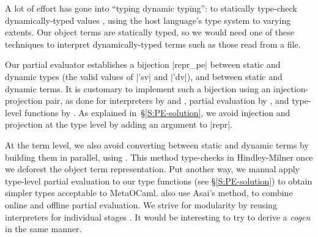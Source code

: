 \ifshort\else
A lot of effort has gone into ``typing dynamic typing'': to statically
type-check dynamically\hyp typed values
\citep{baars-typing,WalidICFP02,Guillemette-Monier-PLPV,haskell-list},
using the host language's type system to varying extents.
Our object terms are statically typed, so we would
need one of these techniques to interpret dynamically\hyp typed
terms such as those read from a file.
\fi

Our partial evaluator establishes a bijection |repr_pe| between static
and dynamic types (the valid values of |'sv| and |'dv|), and between
static and dynamic terms.  It is customary to implement such a bijection
using an injection\hyp projection pair, as done for interpreters
\ifshort \cite{Ramsey-ML-module-mania,Benton-embedded-interpreters}\else
by \citet{Ramsey-ML-module-mania} and \citet{Benton-embedded-interpreters}\fi,
partial evaluation \ifshort \cite{Danvy-TDPE}\else by \citet{Danvy-TDPE}\fi,
and type-level functions \ifshort \cite{oliveira-typecase}\else by
\citet{oliveira-typecase}\fi.  As explained in~\S\ref{S:PE-solution}, we
avoid injection and projection at the type level by adding an argument
to |repr|.

At the term level, we also avoid converting between static and dynamic
terms by building them in parallel, using \citet{asai-binding-time}.
This method type-checks in Hindley-Milner once we
deforest the object term representation.  Put another way, we
manual apply type-level partial evaluation to our type
functions (see \S\ref{S:PE-solution}) to obtain simpler types 
acceptable to MetaOCaml.
 also use Asai's method,
to combine online
and offline partial evaluation.
We strive for modularity by reusing interpreters for individual stages
\cite{SperberThiemann:TwoForOne}.  It would be interesting
to try to derive a \emph{cogen} \cite{Thiemann:cogeninsixlines}
in the same manner.

